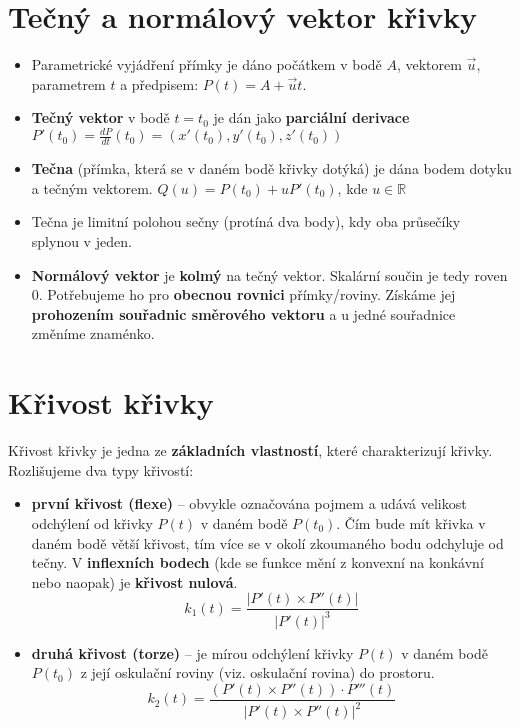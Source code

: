 \section{Tečný a normálový vektor křivky}
\begin{itemize}
    \item Parametrické vyjádření přímky je dáno počátkem v bodě $ A $, vektorem $ \vec{u} $, parametrem $ t $ a předpisem: $P(t) = A + \vec{u}t.$
    \item \textbf{Tečný vektor} v bodě $t=t_0$ je dán jako \textbf{parciální derivace} $P'(t_0) = \frac{dP}{dt}(t_0) = (x'(t_0), y'(t_0), z'(t_0))$
    \item \textbf{Tečna} (přímka, která se v daném bodě křivky dotýká) je dána bodem dotyku a tečným vektorem. $Q(u) = P(t_0) + uP'(t_0)$, kde $u \in \mathbb{R}$
    \item Tečna je limitní polohou sečny (protíná dva body), kdy oba průsečíky splynou v jeden.
\end{itemize}
\begin{itemize}
    \item \textbf{Normálový vektor} je \textbf{kolmý} na tečný vektor. Skalární součin je tedy roven 0. Potřebujeme ho pro \textbf{obecnou rovnici} přímky/roviny. Získáme jej \textbf{prohozením souřadnic směrového vektoru} a u jedné souřadnice změníme znaménko.
\end{itemize}

\section{Křivost křivky}
Křivost křivky je jedna ze \textbf{základních vlastností}, které charakterizují křivky. Rozlišujeme dva typy křivostí:
\begin{itemize}
    \item \textbf{první křivost (flexe)} -- obvykle označována pojmem  a udává velikost odchýlení od křivky $P(t)$ v daném bodě $P(t_0)$. Čím bude mít křivka v daném bodě větší křivost, tím více se v okolí zkoumaného bodu odchyluje od tečny. V \textbf{inflexních bodech} (kde se funkce mění z konvexní na konkávní nebo naopak) je \textbf{křivost nulová}.
          \begin{equation*}
              k_1(t) = \frac{|P'(t) \times P''(t)|}{|P'(t)|^3}
          \end{equation*}
    \item \textbf{druhá křivost (torze)} -- je mírou odchýlení křivky $P(t)$ v daném bodě $P(t_0)$ z její oskulační roviny (viz. oskulační rovina) do prostoru.
          \begin{equation*}
              k_2(t) = \frac{(P'(t) \times P''(t)) \cdot P'''(t)}{|P'(t) \times P''(t)|^2}
          \end{equation*}
\end{itemize}
